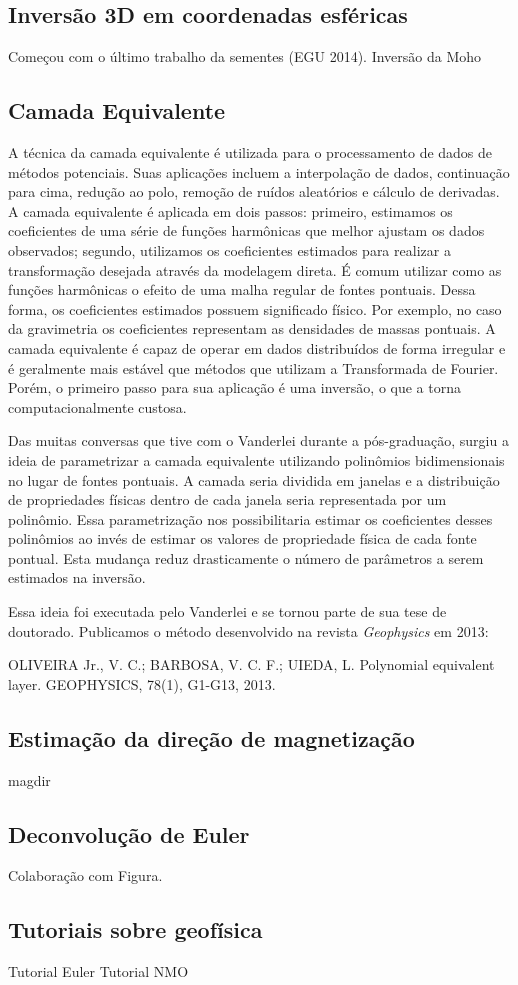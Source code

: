 \subsection{Inversão 3D em coordenadas esféricas}


Começou com o último trabalho da sementes (EGU 2014).
Inversão da Moho


\subsection{Camada Equivalente}

A técnica da camada equivalente é utilizada para o processamento de dados de
métodos potenciais.
Suas aplicações incluem a interpolação de dados, continuação para cima, redução
ao polo, remoção de ruídos aleatórios e cálculo de derivadas.
A camada equivalente é aplicada em dois passos:
primeiro, estimamos os coeficientes de uma série de funções harmônicas que
melhor ajustam os dados observados;
segundo, utilizamos os coeficientes estimados para realizar a transformação
desejada através da modelagem direta.
É comum utilizar como as funções harmônicas o efeito de uma malha regular de
fontes pontuais.
Dessa forma, os coeficientes estimados possuem significado físico.
Por exemplo, no caso da gravimetria os coeficientes representam as densidades
de massas pontuais.
A camada equivalente é capaz de operar em dados distribuídos de forma irregular
e é geralmente mais estável que métodos que utilizam a Transformada de Fourier.
Porém, o primeiro passo para sua aplicação é uma inversão, o que a torna
computacionalmente custosa.

Das muitas conversas que tive com o Vanderlei durante a pós-graduação,
surgiu a ideia de parametrizar a camada equivalente utilizando polinômios
bidimensionais no lugar de fontes pontuais.
A camada seria dividida em janelas e a distribuição de propriedades físicas
dentro de cada janela seria representada por um polinômio.
Essa parametrização nos possibilitaria estimar os coeficientes desses
polinômios ao invés de estimar os valores de propriedade física de cada fonte
pontual.
Esta mudança reduz drasticamente o número de parâmetros a serem estimados na
inversão.

Essa ideia foi executada pelo Vanderlei e se tornou parte de sua tese de
doutorado.
Publicamos o método desenvolvido na revista \textit{Geophysics} em 2013:

\begin{displayquote}
    OLIVEIRA Jr., V. C.; BARBOSA,  V. C. F.; UIEDA, L. Polynomial equivalent
    layer. GEOPHYSICS, 78(1), G1-G13, 2013.
\end{displayquote}


\subsection{Estimação da direção de magnetização}

magdir


\subsection{Deconvolução de Euler}

Colaboração com Figura.


\subsection{Tutoriais sobre geofísica}

Tutorial Euler
Tutorial NMO
